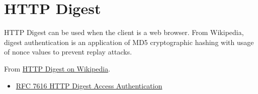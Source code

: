 \section{HTTP Digest}

HTTP Digest can be used when the client is a web browser. From Wikipedia,
digest authentication is an application of MD5 cryptographic hashing with usage
of nonce values to prevent replay attacks.

From \href{https://en.wikipedia.org/wiki/Digest_access_authentication}{HTTP Digest on Wikipedia}.

\begin{itemize}
  \item \href{https://tools.ietf.org/html/rfc7616}{%
      RFC 7616 HTTP Digest Access Authentication}
\end{itemize}


